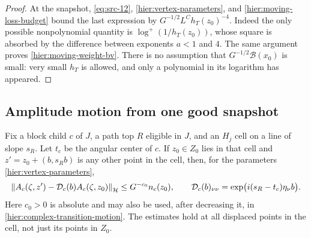 \begin{proof}
At the snapshot, \eqref{eq:src-12},
\eqref{hier:vertex-parameters}, and
\eqref{hier:moving-loss-budget} bound the last expression by
$G^{-1/2}L^C h_T(z_0)^{-4}$.  Indeed the only possible nonpolynomial
quantity is $\log^+(1/h_T(z_0))$, whose square is absorbed by the
difference between exponents $a<1$ and $4$.  The same argument proves
\eqref{hier:moving-weight-bv}.  There is no assumption that
$G^{-1/2}\mathcal B(x_0)$ is small: very small $h_T$ is allowed, and
only a polynomial in its logarithm has appeared.
\end{proof}

\subsection{Amplitude motion from one good snapshot}

\begin{lemma}
\label{hier:amplitude-motion}
Fix a block child $c$ of $J$, a path top $R$ eligible in $J$,
and an $H_j$ cell on a line of slope $s_R$.  Let $t_c$ be the angular
center of $c$.  If $z_0\in Z_0$ lies in that cell and
$z'=z_0+(b,s_Rb)$ is any other point in the cell, then, for the parameters \eqref{hier:vertex-parameters},
\begin{equation}
 \left\|A_c(\zeta,z')-\mathcal D_c(b)A_c(\zeta,z_0)\right\|_{\mathcal H}
 \le G^{-c_0}n_c(z_0),
 \qquad
 \mathcal D_c(b)_{\nu\nu}
 =\exp\bigl(i(s_R-t_c)\eta_\nu b\bigr).
 \label{eq:src-21}
\end{equation}
Here $c_0>0$ is absolute and may also be used, after decreasing it, in
\eqref{hier:complex-transition-motion}.  The estimates hold at all
displaced points in the cell, not just its points in $Z_0$.
\end{lemma}

